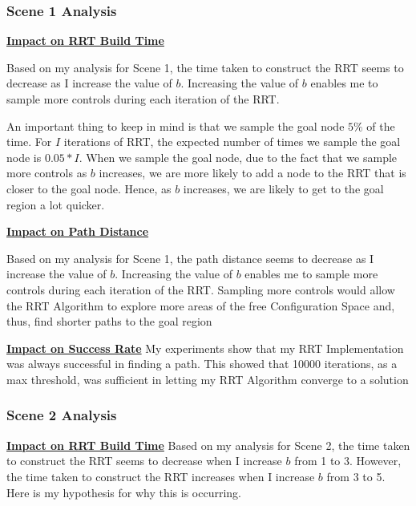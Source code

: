 \documentclass{article}
\begin{document}
\newpage 
\subsubsection{Scene 1 Analysis}

\textbf{\underline{Impact on RRT Build Time}} \newline

Based on my analysis for Scene 1, the time taken to construct the RRT seems to decrease as I increase the value of $b$. Increasing the value of $b$ enables me to sample more controls during each iteration of the RRT. \newline 

An important thing to keep in mind is that we sample the goal node $5\%$ of the time. For $I$ iterations of RRT, the expected number of times we sample the goal node is $0.05 * I$. When we sample the goal node, due to the fact that we sample more controls as $b$ increases, we are more likely to add a node to the RRT that is closer to the goal node. Hence, as $b$ increases, we are likely to get to the goal region a lot quicker. \newline 


\textbf{\underline{Impact on Path Distance}} \newline

Based on my analysis for Scene 1, the path distance seems to decrease as I increase the value of $b$. Increasing the value of $b$ enables me to sample more controls during each iteration of the RRT. Sampling more controls would allow the RRT Algorithm to explore more areas of the free Configuration Space and, thus, find shorter paths to the goal region \newline 


\textbf{\underline{Impact on Success Rate}} \newline
My experiments show that my RRT Implementation was always successful in finding a path. This showed that 10000 iterations, as a max threshold, was sufficient in letting my RRT Algorithm converge to a solution

\subsubsection{Scene 2 Analysis}

\textbf{\underline{Impact on RRT Build Time}} \newline
Based on my analysis for Scene 2, the time taken to construct the RRT seems to decrease when I increase $b$ from 1 to 3. However, the time taken to construct the RRT increases when I increase $b$ from 3 to 5. Here is my hypothesis for why this is occurring. \newline 
\end{document}
